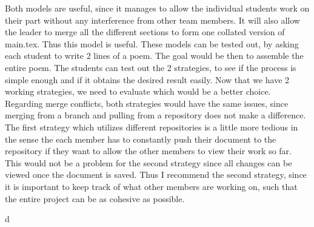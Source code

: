 \documentclass[12pt]{article}
\begin{document}
\vskip0.25in Both models are useful, since it manages to allow the individual students work on their part without any interference from other team members. It will also allow the leader to merge all the different sections to form one collated version of main.tex. Thus this model is useful.
\vskip0.25in These models can be tested out, by asking each student to write 2 lines of a poem. The goal would be then to assemble the entire poem. The students can test out the 2 strategies, to see if the process is simple enough and if it obtains the desired result easily.
\vskip0.25in Now that we have 2 working strategies, we need to evaluate which would be a better choice. Regarding merge conflicts, both strategies would have the same issues, since merging from a branch and pulling from a repository does not make a difference. The first strategy which utilizes different repositories is a little more tedious in the sense the each member has to constantly push their document to the repository if they want to allow the other members to view their work so far. This would not be a problem for the second strategy since all changes can be viewed once the document is saved.  Thus I recommend the second strategy, since it is important to keep track of what other members are working on, such that the entire project can be as cohesive as possible.


d 
\end{document}
